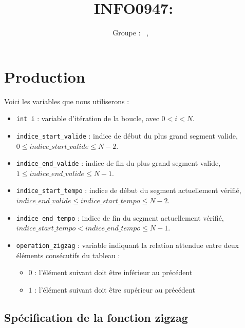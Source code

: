 \documentclass[a4paper, 11pt, oneside]{article}
\title{INFO0947: \intitule}
\author{Groupe \GrNbr : \PrenomUN~\textsc{\NomUN}, \PrenomDEUX~\textsc{\NomDEUX}}
\date{}
\begin{document}
\maketitle


\section{Production}

Voici les variables que nous utiliserons :

\begin{itemize}

\item \texttt{int i} : variable d'itération de la boucle, avec $0 < i < N$.

\item \texttt{indice\_start\_valide} : indice de début du plus grand segment valide, 
$0 \le indice\_start\_valide \le N-2$.

\item \texttt{indice\_end\_valide} : indice de fin du plus grand segment valide, 
$1 \le indice\_end\_valide \le N-1$.

\item \texttt{indice\_start\_tempo} : indice de début du segment actuellement vérifié, 
$indice\_end\_valide \le indice\_start\_tempo \le N-2$.

\item \texttt{indice\_end\_tempo} : indice de fin du segment actuellement vérifié, 
$indice\_start\_tempo < indice\_end\_tempo \le N-1$.

\item \texttt{operation\_zigzag} : variable indiquant la relation attendue entre deux
éléments consécutifs du tableau :
\begin{itemize}
\item $0$ : l'élément suivant doit être inférieur au précédent
\item $1$ : l'élément suivant doit être supérieur au précédent
\end{itemize}

\end{itemize}

\subsection*{Spécification de la fonction zigzag}
\end{document}
